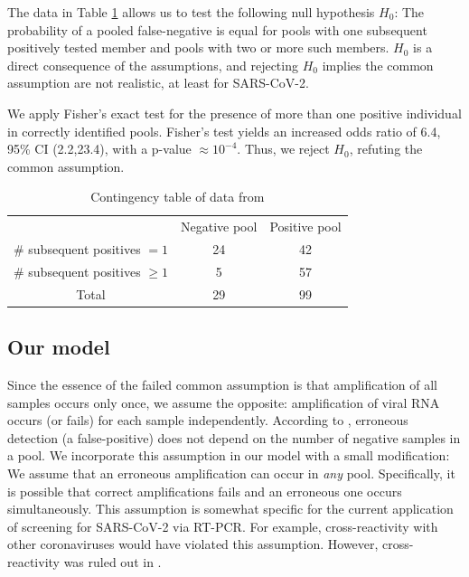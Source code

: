 \documentclass{article}
\begin{document}
The data in Table \ref{table} allows us to test the following null
hypothesis $H_0$: The probability of a pooled false-negative is equal
for pools with one subsequent positively tested member and pools with
two or more such members. $H_0$ is a direct consequence of the
assumptions, and rejecting $H_0$ implies the common assumption are not
realistic, at least for SARS-CoV-2.

We apply Fisher's exact test for the presence of more than one
positive individual in correctly identified pools. Fisher's test
yields an increased odds ratio of 6.4, 95\% CI (2.2,23.4), with a
p-value $\approx 10^{-4}$. Thus, we reject $H_0$, refuting the common
assumption.

\begin{table}[h]
\centering
\begin{tabular}{ c c c }
                                & Negative pool  & Positive pool \\%
\# subsequent positives $=1$    & 24             & 42            \\%
\# subsequent positives $\geq1$ & 5              & 57            \\%
 Total                          & 29             & 99            \\%
\end{tabular}
\caption{Contingency table of data from \cite{Salazar}}\label{table}
\end{table}

\subsection{Our model}\label{subsec:ours}
Since the essence of the failed common assumption is that
amplification of all samples occurs only once, we assume the opposite:
amplification of viral RNA occurs (or fails) for each sample
independently.  According to \cite{Simplistic1, Simplistic2, Kim,
  OptimalDorfmanPool}, erroneous detection (a false-positive) does not
depend on the number of negative samples in a pool. We incorporate
this assumption in our model with a small modification: We assume that
an erroneous amplification can occur in \emph{any} pool. Specifically,
it is possible that correct amplifications fails and an erroneous one
occurs simultaneously. This assumption is somewhat specific for the
current application of screening for SARS-CoV-2 via RT-PCR. For
example, cross-reactivity with other coronaviruses would have violated
this assumption. However, cross-reactivity was ruled out in
\cite{KitComparison}.
\end{document}
